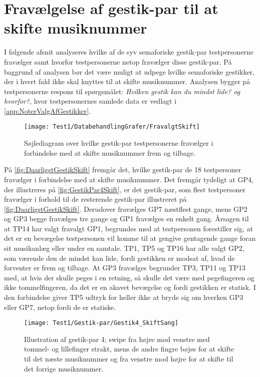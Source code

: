 \section{Fravælgelse af gestik-par til at skifte musiknummer}
\label{app:TestresultaterSkiftDaarlig}
%
I følgende afsnit analyseres hvilke af de syv semaforiske gestik-par testpersonerne fravælger samt hvorfor testpersonerne netop fravælger disse gestik-par. På baggrund af analysen bør det være muligt at udpege hvilke semaforiske gestikker, der i hvert fald ikke skal knyttes til at skifte musiknummer. Analysen bygger på testpersonerne respons til spørgsmålet: \textit{Hvilken gestik kan du mindst lide? og hvorfor?}, hvor testpersonernes samlede data er vedlagt i \autoref{app:NoterValgAfGestikker}.
%
\begin{figure}[H]
	\centering
	\texttt{[image: Test1/DatabehandlingGrafer/FravalgtSkift]}
	\caption{Søjlediagram over hvilke gestik-par testpersonerne fravælger i forbindelse med at skifte musiknummer frem og tilbage.}
	\label{fig:DaarligstGestikSkift}
\end{figure}
\noindent
%
På \autoref{fig:DaarligstGestikSkift} fremgår det, hvilke gestik-par de 18 testpersoner fravælger i forbindelse med at skifte musiknummer. Det fremgår tydeligt at GP4, der illustreres på \autoref{fig:GestikPar4Skift}, er det gestik-par, som flest testpersoner fravælger i forhold til de resterende gestik-par illustreret på \autoref{fig:DaarligstGestikSkift}. Derudover fravælges GP7 næstflest gange, mens GP2 og GP3 begge fravælges tre gange og GP1 fravælges en enkelt gang. Årsagen til at TP14 har valgt fravalgt GP1, begrundes med at testpersonen forestiller sig, at det er en bevægelse testpersonen vil komme til at gengive gentagende gange foran sit musikanlæg eller under en samtale. TP1, TP5 og TP16 har alle valgt GP2, som værende den de mindst kan lide, fordi gestikken er modsat af, hvad de forventer er frem og tilbage. At GP3 fravælges begrunder TP3, TP11 og TP13 med, at hvis der skulle peges i en retning, så skulle det være med pegefingeren og ikke tommelfingeren, da det er en akavet bevægelse og fordi gestikken er statisk. I den forbindelse giver TP5 udtryk for heller ikke at bryde sig om hverken GP3 eller GP7, netop fordi de er statiske.
%
\begin{figure}[H]
	\centering
	\texttt{[image: Test1/Gestik-par/Gestik4\_SkiftSang]}
	\caption{Illustration af gestik-par 4; swipe fra højre mod venstre med tommel- og lillefinger strakt, mens de andre fingre bøjes for at skifte til det næste musiknummer og fra venstre mod højre for at skifte til det forrige musiknummer.}
	\label{fig:GestikPar4Skift}
\end{figure}
